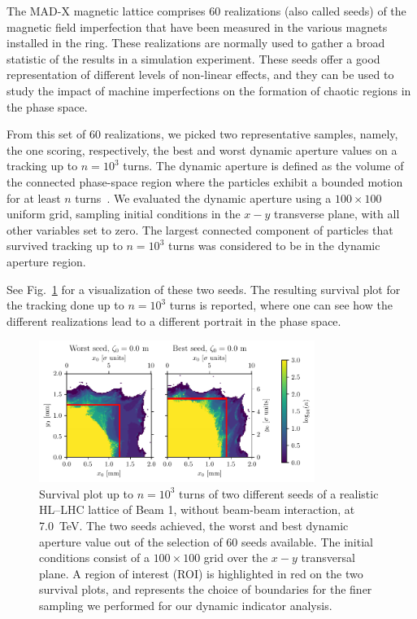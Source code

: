 The MAD-X magnetic lattice comprises 60 realizations (also called seeds) of the magnetic field imperfection that have been measured in the various magnets installed in the ring. These realizations are normally used to gather a broad statistic of the results in a simulation experiment. These seeds offer a good representation of different levels of non-linear effects, and they can be used to study the impact of machine imperfections on the formation of chaotic regions in the phase space.

From this set of 60 realizations, we picked two representative samples, namely, the one scoring, respectively, the best and worst dynamic aperture values on a tracking up to $n=10^3$ turns. The dynamic aperture is defined as the volume of the connected phase-space region where the particles exhibit a bounded motion for at least $n$ turns~\cite{DAdef, invlog}. We evaluated the dynamic aperture using a $100\times100$ uniform grid, sampling initial conditions in the $x-y$ transverse plane, with all other variables set to zero. The largest connected component of particles that survived tracking up to $n=10^3$ turns was considered to be in the dynamic aperture region.

See Fig.~\ref{fig:seed_presentation} for a visualization of these two seeds. The resulting survival plot for the tracking done up to $n=10^3$ turns is reported, where one can see how the different realizations lead to a different portrait in the phase space.

\begin{figure}[htp]
    \centering
    \includegraphics[width=0.8\textwidth]{6_lhc_dynamic_indicators/figs/quick_scan.pdf}
    \caption{Survival plot up to $n=10^3$ turns of two different seeds of a realistic HL--LHC lattice of Beam 1, without beam-beam interaction, at \SI{7.0}{TeV}. The two seeds achieved, the worst and best dynamic aperture value out of the selection of 60 seeds available. The initial conditions consist of a $100\times100$ grid over the $x-y$ transversal plane. A region of interest (ROI) is highlighted in red on the two survival plots, and represents the choice of boundaries for the finer sampling we performed for our dynamic indicator analysis.}
    \label{fig:seed_presentation}
\end{figure}

